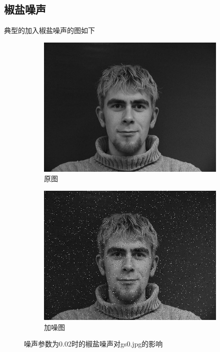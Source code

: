 \subsection{椒盐噪声}
\label{sec:speckle-data}

典型的加入椒盐噪声的图如下
\begin{figure}[H]
  \centering
  \begin{subfigure}[b]{0.4\textwidth}
    \includegraphics[keepaspectratio=true,
    width=\textwidth]{images/gs0.jpg}
    \caption{原图}
  \end{subfigure}
  \begin{subfigure}[b]{0.4\textwidth}
    \includegraphics[keepaspectratio=true,
    width=\textwidth]{images/gs0_0.02_speckle.jpg}
    \caption{加噪图}
  \end{subfigure}
  \caption{噪声参数为0.02时的椒盐噪声对gs0.jpg的影响}
\label{fig:speckle-ex-img}
\end{figure}

